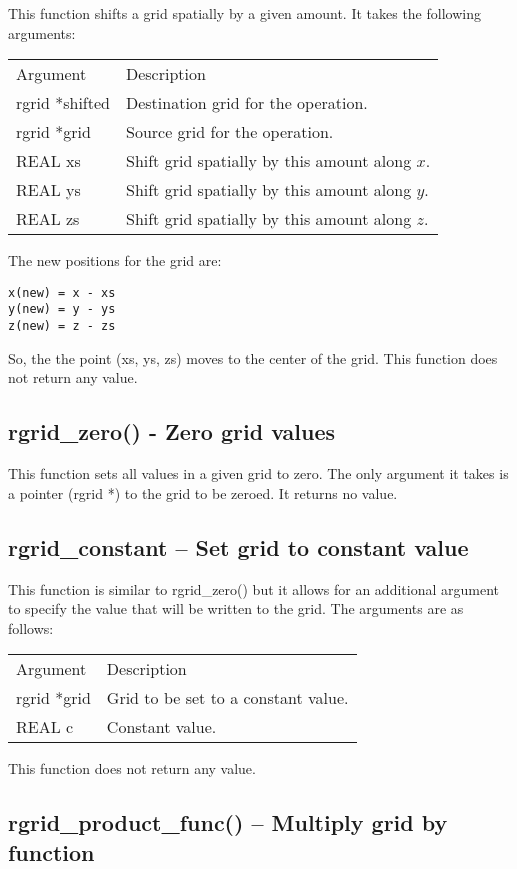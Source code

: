 \documentclass[12pt,letterpaper]{report}
\begin{document}
This function shifts a grid spatially by a given amount. It takes the following arguments:
\begin{longtable}{p{} p{}}
Argument & Description\\
\cline{1-2}
rgrid *shifted & Destination grid for the operation.\\
rgrid *grid & Source grid for the operation.\\
REAL xs & Shift grid spatially by this amount along $x$.\\
REAL ys & Shift grid spatially by this amount along $y$.\\
REAL zs & Shift grid spatially by this amount along $z$.\\
\end{longtable}
\noindent
The new positions for the grid are:
\begin{verbatim}
x(new) = x - xs 
y(new) = y - ys 
z(new) = z - zs
\end{verbatim}
\noindent
So, the the point (xs, ys, zs) moves to the center of the grid. This function does not return any value.

\subsection{rgrid\_zero() - Zero grid values}

This function sets all values in a given grid to zero. The only argument it takes is a pointer (rgrid *) to the grid to be zeroed. It returns no value.

\subsection{rgrid\_constant -- Set grid to constant value}

This function is similar to rgrid\_zero() but it allows for an additional argument to specify the value that will be written to the grid. The arguments are as follows:
\begin{longtable}{p{} p{}}
Argument & Description\\
\cline{1-2}
rgrid *grid & Grid to be set to a constant value.\\
REAL c & Constant value.
\end{longtable}
\noindent
This function does not return any value.

\subsection{rgrid\_product\_func() -- Multiply grid by function}
\end{document}
